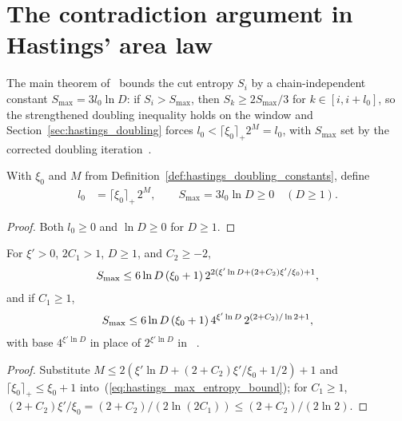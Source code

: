 \section{The contradiction argument in Hastings' area law}
\label{sec:hastings_main_stage}


The main theorem of~\cite{Hastings2007AreaLaw} bounds the cut entropy $S_i$ by
a chain-independent constant $S_{\max}=3l_0\ln D$: if $S_i>S_{\max}$, then
$S_k\ge2S_{\max}/3$ for $k\in[i,i+l_0]$, so the strengthened doubling
inequality holds on the window and Section~\ref{sec:hastings_doubling} forces
$l_0<\lceil\xi_0\rceil_+2^M=l_0$, with $S_{\max}$ set by the corrected doubling
iteration~\cite{gap:hastings07_doubling_constants}.

\begin{definition}
    \label{def:hastings_max_entropy_bound}
    \leanok
    With $\xi_0$ and $M$ from Definition~\ref{def:hastings_doubling_constants},
    define
    \begin{align}
        l_0 & =\lceil\xi_0\rceil_+\,2^M, \qquad
        S_{\max} =3l_0\ln D\ge0\quad(D\ge1).
        \label{eq:hastings_max_entropy_bound}
    \end{align}
\end{definition}
\begin{proof}\leanok
    Both $l_0\ge0$ and $\ln D\ge0$ for $D\ge1$.
\end{proof}

\begin{lemma}
    \label{thm:hastings_max_entropy_bound_le}
    \leanok
    For $\xi'>0$, $2C_1>1$, $D\ge1$, and $C_2\ge-2$,
    \begin{align}
        S_{\max}\le6\ln D\,(\xi_0+1)\,
        2^{2(\xi'\ln D+(2+C_2)\xi'/\xi_0)+1},
        \notag
    \end{align}
    and if $C_1\ge1$,
    \begin{align}
        S_{\max}\le6\ln D\,(\xi_0+1)\,4^{\xi'\ln D}\,
        2^{(2+C_2)/\ln2+1},
        \notag
    \end{align}
    with base $4^{\xi'\ln D}$ in place of $2^{\xi'\ln D}$ in
    \cite[eq.~(smd)]{Hastings2007AreaLaw}~\cite{gap:hastings07_doubling_constants}.
\end{lemma}
\begin{proof}\leanok
    Substitute $M\le2(\xi'\ln D+(2+C_2)\xi'/\xi_0+1/2)+1$ and
    $\lceil\xi_0\rceil_+\le\xi_0+1$ into~(\ref{eq:hastings_max_entropy_bound});
    for $C_1\ge1$, $(2+C_2)\xi'/\xi_0=(2+C_2)/(2\ln(2C_1))\le(2+C_2)/(2\ln2)$.
\end{proof}

